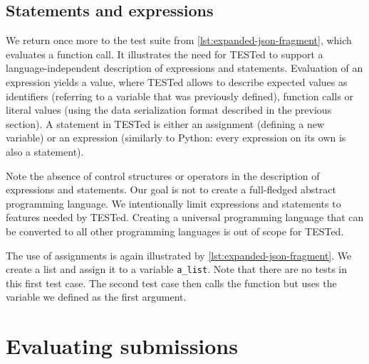 \documentclass[../main]{subfiles}
\begin{document}

\subsection{Statements and expressions}\label{subsec:tested1-statements-and-expressions}

We return once more to the test suite from \cref{lst:expanded-json-fragment}, which evaluates a function call.
It illustrates the need for TESTed to support a language-independent description of expressions and statements.
Evaluation of an expression yields a value, where TESTed allows to describe expected values as identifiers (referring to a variable that was previously defined), function calls or literal values (using the data serialization format described in the previous section).
A statement in TESTed is either an assignment (defining a new variable) or an expression (similarly to Python: every expression on its own is also a statement).

Note the absence of control structures or operators in the description of expressions and statements.
Our goal is not to create a full-fledged abstract programming language.
We intentionally limit expressions and statements to features needed by TESTed.
Creating a universal programming language that can be converted to all other programming languages is out of scope for TESTed.

The use of assignments is again illustrated by \cref{lst:expanded-json-fragment}.
We create a list and assign it to a variable \texttt{a\_list}.
Note that there are no tests in this first test case.
The second test case then calls the function but uses the variable we defined as the first argument.

\section{Evaluating submissions}\label{sec:tested1-evaluating-submissions}
\end{document}
